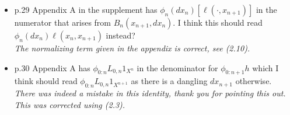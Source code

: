 \documentclass[12pt]{amsart}
\begin{document}
\begin{itemize}
{\em Do not agree!}
\item p.29 Appendix A in the supplement has $\phi_n(dx_n)[\ell(\cdot,x_{n+1})]$  in the numerator that arises from $B_n(x_{n+1},dx_n)$. I think this should read $\phi_n(dx_n)\ell(x_n,x_{n+1})$  instead?\\
{\em The normalizing term given in the appendix is correct, see (2.10).}
\item p.30 Appendix A has $\phi_{0:n}L_{0,n}1_{X^n}$  in the denominator for  $\phi_{0:n+1}h$ which I think should read  $\phi_{0:n}L_{0,n}1_{X^{n+1}}$ as there is a dangling $dx_{n+1}$ otherwise.\\
{\em There was indeed a mistake in this identity, thank you for pointing this out. This was corrected using (2.3).}
\end{itemize}
\end{document}
